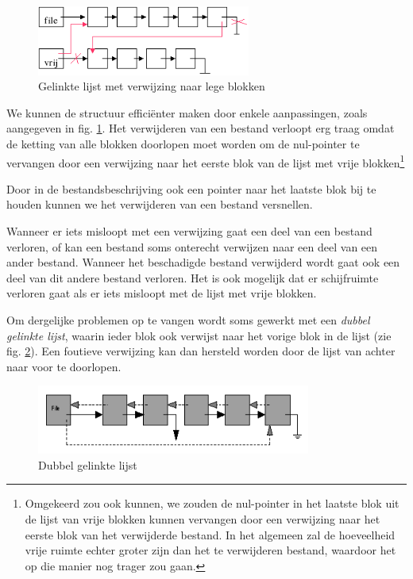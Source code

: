 \begin{figure}
\begin{center}
\includegraphics[width=70mm]{images/fig0409.png}
\end{center}
\caption{Gelinkte lijst met verwijzing naar lege blokken}
\label{linklijsteff}
\end{figure}

We kunnen de structuur effici\"enter maken door enkele
aanpassingen, zoals aangegeven in fig. \ref{linklijsteff}. Het verwijderen van een bestand verloopt erg traag omdat
de ketting van alle blokken doorlopen moet worden om de nul-pointer te
vervangen door een verwijzing naar het eerste blok van de lijst met
vrije blokken\footnote{Omgekeerd zou ook kunnen, we zouden de nul-pointer in het
laatste blok uit de lijst van vrije blokken kunnen vervangen door een verwijzing
naar het eerste blok van het verwijderde bestand. In het algemeen zal de
hoeveelheid vrije ruimte echter groter zijn dan het te verwijderen bestand,
waardoor het op die manier nog trager zou gaan.}

Door in de bestandsbeschrijving ook een pointer naar het laatste
blok bij te houden kunnen we het verwijderen van een bestand
versnellen.

Wanneer er iets misloopt met een verwijzing gaat een deel van
een bestand verloren, of kan een bestand soms onterecht verwijzen naar
een deel van een ander bestand. Wanneer het beschadigde bestand
verwijderd wordt gaat ook een deel van dit andere bestand verloren.
Het is ook mogelijk dat er schijfruimte verloren gaat als er iets
misloopt met de lijst met vrije blokken.

Om dergelijke problemen op te vangen wordt soms gewerkt met een
\emph{dubbel gelinkte lijst}, waarin ieder blok ook
verwijst naar het vorige blok in de lijst (zie fig. \ref{dubellink}). Een foutieve verwijzing kan
dan hersteld worden door de lijst van achter naar voor te
doorlopen.

\begin{figure}
\begin{center}
\includegraphics[width=90mm]{images/fig0410.png}
\caption{Dubbel gelinkte lijst}
\label{dubellink}
\end{center}
\end{figure}


